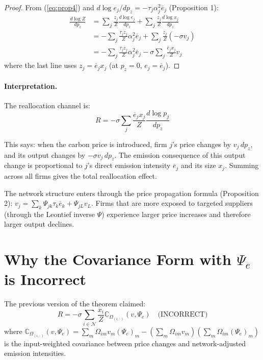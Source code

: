 \documentclass[11pt]{article}
\newcommand{\N}{\mathcal{N}}
\begin{document}
\begin{proof}
From (\ref{eq:prop4}) and $d\log e_j/dp_z = -\tau_j\alpha_j^2\overline{e}_j$ (Proposition 1):
\begin{align*}
    \frac{d\log Z}{dp_z} &= \sum_j \frac{z_j}{Z}\frac{d\log e_j}{dp_z} + \sum_j \frac{z_j}{Z}\frac{d\log x_j}{dp_z} \\
    &= -\sum_j \frac{\tau_j z_j}{Z}\alpha_j^2\overline{e}_j + \sum_j \frac{z_j}{Z}(-\sigma v_j) \\
    &= -\sum_j \frac{\tau_j z_j}{Z}\alpha_j^2\overline{e}_j - \sigma\sum_j \frac{\overline{e}_j x_j}{Z} v_j
\end{align*}
where the last line uses $z_j = \overline{e}_j x_j$ (at $p_z = 0$, $e_j = \overline{e}_j$).
\end{proof}

\paragraph{Interpretation.} The reallocation channel is:
$$R = -\sigma \sum_j \frac{\overline{e}_j x_j}{Z}\frac{d\log p_j}{dp_z}$$

This says: when the carbon price is introduced, firm $j$'s price changes by $v_j\, dp_z$, and its output changes by $-\sigma v_j\, dp_z$. The emission consequence of this output change is proportional to $j$'s direct emission intensity $\overline{e}_j$ and its size $x_j$. Summing across all firms gives the total reallocation effect.

The network structure enters through the price propagation formula (Proposition 2): $v_j = \sum_k \Psi_{jk}\tau_k\overline{e}_k + \Psi_{jL}v_L$. Firms that are more exposed to targeted suppliers (through the Leontief inverse $\Psi$) experience larger price increases and therefore larger output declines.

\section{Why the Covariance Form with $\Psi_e$ is Incorrect}

The previous version of the theorem claimed:
\begin{equation}
    \label{eq:old_theorem}
    R = -\sigma \sum_{i \in \N}\frac{x_i}{Z}\mathbb{C}_{\Omega_{(i,:)}}(v, \Psi_e) \quad \text{(INCORRECT)}
\end{equation}
where $\mathbb{C}_{\Omega_{(i,:)}}(v, \Psi_e) = \sum_m \Omega_{im}v_m(\Psi_e)_m - (\sum_m \Omega_{im}v_m)(\sum_m \Omega_{im}(\Psi_e)_m)$ is the input-weighted covariance between price changes and network-adjusted emission intensities.
\end{document}

